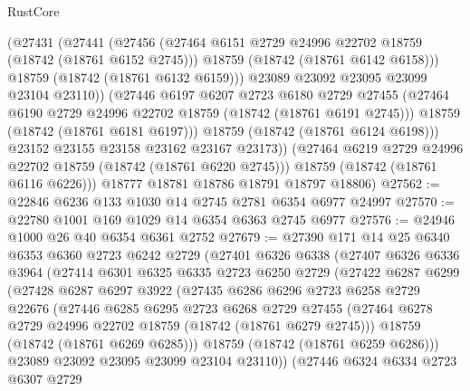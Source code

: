 \begin{lexlean}{RustCore}
\begin{coremodule}
                (@27431
                  (@27441
                    (@27456
                      (@27464 @6151 @2729 @24996 @22702 @18759 (@18742 (@18761 @6152 @2745)))
                      @18759
                      (@18742 (@18761 @6142 @6158)))
                    @18759
                    (@18742 (@18761 @6132 @6159)))
                  @23089
                  @23092
                  @23095
                  @23099
                  @23104
                  @23110))
              (@27446
                @6197
                @6207
                @2723
                @6180
                @2729
                @27455
                (@27464 @6190 @2729 @24996 @22702 @18759 (@18742 (@18761 @6191 @2745)))
                @18759
                (@18742 (@18761 @6181 @6197)))
              @18759
              (@18742 (@18761 @6124 @6198)))
            @23152
            @23155
            @23158
            @23162
            @23167
            @23173))
        (@27464 @6219 @2729 @24996 @22702 @18759 (@18742 (@18761 @6220 @2745)))
        @18759
        (@18742 (@18761 @6116 @6226)))
      @18777
      @18781
      @18786
      @18791
      @18797
      @18806)
@27562 := @22846 @6236 @133 @1030 @14 @2745 @2781 @6354 @6977 @24997
@27570 := @22780 @1001 @169 @1029 @14 @6354 @6363 @2745 @6977
@27576 := @24946 @1000 @26 @40 @6354 @6361 @2752
@27679 := @27390
    @171
    @14
    @25
    @6340
    @6353
    @6360
    @2723
    @6242
    @2729
    (@27401
      @6326
      @6338
      (@27407
        @6326
        @6336
        @3964
        (@27414
          @6301
          @6325
          @6335
          @2723
          @6250
          @2729
          (@27422
            @6287
            @6299
            (@27428
              @6287
              @6297
              @3922
              (@27435
                @6286
                @6296
                @2723
                @6258
                @2729
                @22676
                (@27446
                  @6285
                  @6295
                  @2723
                  @6268
                  @2729
                  @27455
                  (@27464 @6278 @2729 @24996 @22702 @18759 (@18742 (@18761 @6279 @2745)))
                  @18759
                  (@18742 (@18761 @6269 @6285)))
                @18759
                (@18742 (@18761 @6259 @6286)))
              @23089
              @23092
              @23095
              @23099
              @23104
              @23110))
          (@27446
            @6324
            @6334
            @2723
            @6307
            @2729

\end{coremodule}
\end{lexlean}
